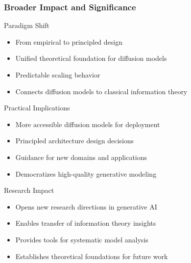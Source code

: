 \documentclass[aspectratio=169]{beamer}
\begin{document}
\begin{frame}
\frametitle{Broader Impact and Significance}
\begin{block}{Paradigm Shift}
\begin{itemize}
\item \textcolor{myblue}{From empirical to principled design}
\item \textcolor{myblue}{Unified theoretical foundation} for diffusion models
\item \textcolor{myblue}{Predictable scaling behavior}
\item \textcolor{myblue}{Connects diffusion models to classical information theory}
\end{itemize}
\end{block}

\begin{block}{Practical Implications}
\begin{itemize}
\item \textcolor{mygreen}{More accessible diffusion models for deployment}
\item \textcolor{mygreen}{Principled architecture design decisions}
\item \textcolor{mygreen}{Guidance for new domains and applications}
\item \textcolor{mygreen}{Democratizes high-quality generative modeling}
\end{itemize}
\end{block}

\begin{block}{Research Impact}
\begin{itemize}
\item \textcolor{myred}{Opens new research directions in generative AI}
\item \textcolor{myred}{Enables transfer of information theory insights}
\item \textcolor{myred}{Provides tools for systematic model analysis}
\item \textcolor{myred}{Establishes theoretical foundations for future work}
\end{itemize}
\end{block}
\end{frame}
\end{document}
